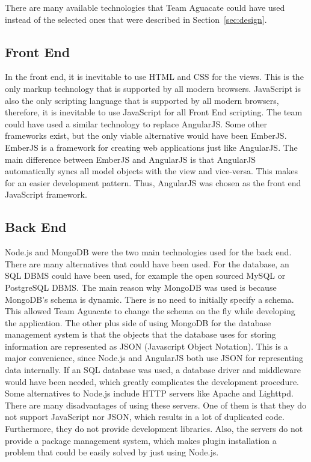\label{sec:alternatives}
There are many available technologies that Team Aguacate could have used instead of the
selected ones that were described in Section~\ref{sec:design}.

\subsection{Front End}
In the front end, it is inevitable to use HTML and CSS for the views. This is the only
markup technology that is supported by all modern browsers. JavaScript is also the only
scripting language that is supported by all modern browsers, therefore, it is inevitable
to use JavaScript for all Front End scripting. The team could have used a similar technology
to replace AngularJS. Some other frameworks exist, but the only viable alternative would
have been EmberJS. EmberJS is a framework for creating web applications just like AngularJS.
The main difference between EmberJS and AngularJS is that AngularJS automatically syncs all
model objects with the view and vice-versa. This makes for an easier development pattern.
Thus, AngularJS was chosen as the front end JavaScript framework.

\subsection{Back End}
Node.js and MongoDB were the two main technologies used for the back end. There are many
alternatives that could have been used. For the database, an SQL DBMS could have been used,
for example the open sourced MySQL or PostgreSQL DBMS. The main reason why MongoDB was used
is because MongoDB's schema is dynamic. There is no need to initially specify a schema. This
allowed Team Aguacate to change the schema on the fly while developing the application.
The other plus side of using MongoDB for the database management system is that the objects
that the database uses for storing information are represented as JSON (Javascript Object
Notation). This is a major convenience, since Node.js and AngularJS both use JSON for
representing data internally. If an SQL database was used, a database driver and middleware
would have been needed, which greatly complicates the development procedure. Some alternatives to Node.js include HTTP servers like Apache and Lighttpd. There are many
disadvantages of using these servers. One of them is that they do not support JavaScript nor
JSON, which results in a lot of duplicated code. Furthermore, they do not provide
development libraries. Also, the servers do not provide a package management system, which
makes plugin installation a problem that could be easily solved by just using Node.js.